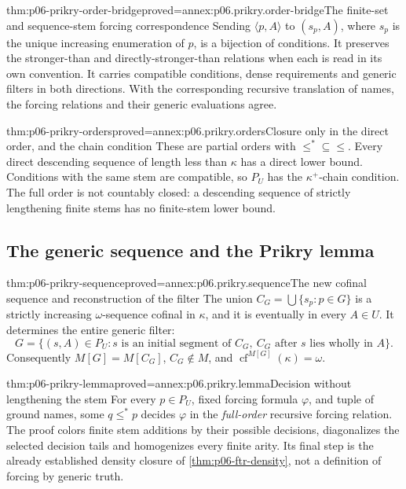 \begin{hblemma}{thm:p06-prikry-order-bridge}{proved=annex:p06.prikry.order-bridge}{The finite-set and sequence-stem forcing correspondence}
Sending \(\langle p,A\rangle\) to \((s_p,A)\), where \(s_p\) is the
unique increasing enumeration of \(p\), is a bijection of conditions.
It preserves the stronger-than and directly-stronger-than relations when
each is read in its own convention. It carries compatible conditions,
dense requirements and generic filters in both directions. With the
corresponding recursive translation of names, the forcing relations and
their generic evaluations agree.
\end{hblemma}

\begin{hbtheorem}{thm:p06-prikry-orders}{proved=annex:p06.prikry.orders}{Closure only in the direct order, and the chain condition}
These are partial orders with \(\leq^*\subseteq\leq\).
Every direct descending sequence of length less than \(\kappa\) has
a direct lower bound. Conditions with the same stem are compatible,
so \(P_U\) has the \(\kappa^+\)-chain condition.
The full order is not countably closed: a descending sequence of
strictly lengthening finite stems has no finite-stem lower bound.
\end{hbtheorem}

\subsection{The generic sequence and the Prikry lemma}

\begin{hbtheorem}{thm:p06-prikry-sequence}{proved=annex:p06.prikry.sequence}{The new cofinal sequence and reconstruction of the filter}
The union \(C_G=\bigcup\{s_p:p\in G\}\) is a strictly increasing
\(\omega\)-sequence cofinal in \(\kappa\), and it is eventually in
every \(A\in U\). It determines the entire generic filter:
\[
 G=\{(s,A)\in P_U:s\text{ is an initial segment of }C_G,
            \ C_G\text{ after }s\text{ lies wholly in }A\}.
\]
Consequently \(M[G]=M[C_G]\), \(C_G\notin M\), and
\(\operatorname{cf}^{M[G]}(\kappa)=\omega\).
\end{hbtheorem}

\begin{hbtheorem}{thm:p06-prikry-lemma}{proved=annex:p06.prikry.lemma}{Decision without lengthening the stem}
For every \(p\in P_U\), fixed forcing formula \(\varphi\), and tuple
of ground names, some \(q\leq^*p\) decides \(\varphi\) in the
\emph{full-order} recursive forcing relation.
The proof colors finite stem additions by their possible decisions,
diagonalizes the selected decision tails and homogenizes every finite
arity. Its final step is the already established density closure of
\cref{thm:p06-ftr-density}, not a definition of forcing by generic truth.
\end{hbtheorem}

